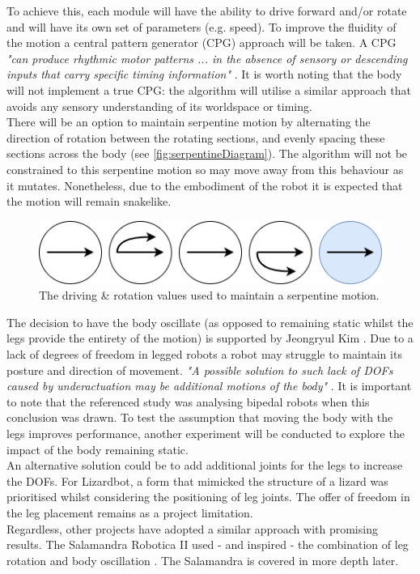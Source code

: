 \documentclass{article}
\begin{document}
To achieve this, each module will have the ability to drive forward and/or rotate and will have its own set of parameters (e.g. speed). To improve the fluidity of the motion a central pattern generator (CPG) approach will be taken. A CPG \textit{"can produce rhythmic motor patterns ... in the absence of sensory or descending inputs that carry specific timing information"} . It is worth noting that the body will not implement a true CPG: the algorithm will utilise a similar approach that avoids any sensory understanding of its worldspace or timing.\\

There will be an option to maintain serpentine motion by alternating the direction of rotation between the rotating sections, and evenly spacing these sections across the body (see \autoref{fig:serpentineDiagram}). The algorithm will not be constrained to this serpentine motion so may move away from this behaviour as it mutates. Nonetheless, due to the embodiment of the robot it is expected that the motion will remain snakelike.\\
\begin{figure}[H]
\centering
\includegraphics[scale=0.6]{serpentineDiagram}
\caption{The driving \& rotation values used to maintain a serpentine motion.}
\label{fig:serpentineDiagram}
\end{figure}

The decision to have the body oscillate (as opposed to remaining static whilst the legs provide the entirety of the motion) is supported by Jeongryul Kim . Due to a lack of degrees of freedom in legged robots a robot may struggle to maintain its posture and direction of movement. \textit{"A possible solution to such lack of DOFs caused by underactuation may be additional motions of the body"} .
It is important to note that the referenced study was analysing bipedal robots when this conclusion was drawn. To test the assumption that moving the body with the legs improves performance, another experiment will be conducted to explore the impact of the body remaining static. \\
An alternative solution could be to add additional joints for the legs to increase the DOFs. For Lizardbot, a form that mimicked the structure of a lizard was prioritised whilst considering the positioning of leg joints. The offer of freedom in the leg placement remains as a project limitation. \\
Regardless, other projects have adopted a similar approach with promising results. The Salamandra Robotica II used - and inspired - the combination of leg rotation and body oscillation . The Salamandra is covered in more depth later.
\end{document}
